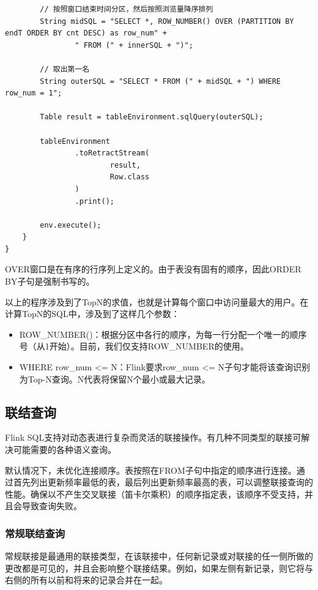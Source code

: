 \documentclass[cn,11pt,chinese]{elegantbook}
\begin{document}
\begin{verbatim}
        // 按照窗口结束时间分区，然后按照浏览量降序排列
        String midSQL = "SELECT *, ROW_NUMBER() OVER (PARTITION BY endT ORDER BY cnt DESC) as row_num" +
                " FROM (" + innerSQL + ")";

        // 取出第一名
        String outerSQL = "SELECT * FROM (" + midSQL + ") WHERE row_num = 1";

        Table result = tableEnvironment.sqlQuery(outerSQL);

        tableEnvironment
                .toRetractStream(
                        result,
                        Row.class
                )
                .print();

        env.execute();
    }
}
\end{verbatim}

OVER窗口是在有序的行序列上定义的。由于表没有固有的顺序，因此ORDER BY子句是强制书写的。

以上的程序涉及到了TopN的求值，也就是计算每个窗口中访问量最大的用户。在计算TopN的SQL中，涉及到了这样几个参数：

\begin{itemize}
    \item ROW\_NUMBER()：根据分区中各行的顺序，为每一行分配一个唯一的顺序号（从1开始）。目前，我们仅支持ROW\_NUMBER的使用。
    \item WHERE row\_num <= N：Flink要求row\_num <= N子句才能将该查询识别为Top-N查询。N代表将保留N个最小或最大记录。
\end{itemize}

\subsection{联结查询}

Flink SQL支持对动态表进行复杂而灵活的联接操作。有几种不同类型的联接可解决可能需要的各种语义查询。

默认情况下，未优化连接顺序。表按照在FROM子句中指定的顺序进行连接。通过首先列出更新频率最低的表，最后列出更新频率最高的表，可以调整联接查询的性能。确保以不产生交叉联接（笛卡尔乘积）的顺序指定表，该顺序不受支持，并且会导致查询失败。

\subsubsection{常规联结查询}

常规联接是最通用的联接类型，在该联接中，任何新记录或对联接的任一侧所做的更改都是可见的，并且会影响整个联接结果。例如，如果左侧有新记录，则它将与右侧的所有以前和将来的记录合并在一起。
\end{document}
